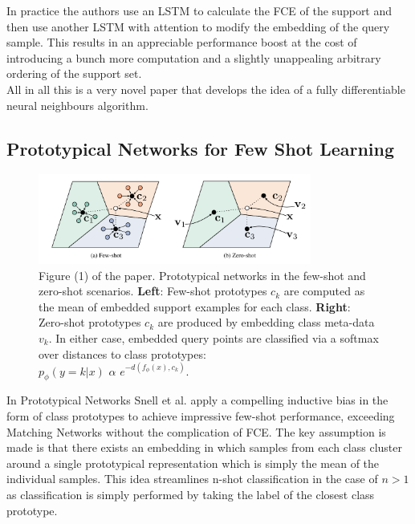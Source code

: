 \documentclass[runningheads,a4paper]{llncs}
\begin{document}
In practice the authors use an LSTM to calculate the FCE of the support and then use another LSTM with attention to modify the embedding of the query sample. This results in an appreciable performance boost at the cost of introducing a bunch more computation and a slightly unappealing arbitrary ordering of the support set. \\

All in all this is a very novel paper that develops the idea of a fully differentiable neural neighbours algorithm.

\subsection{Prototypical Networks for Few Shot Learning}

\begin{figure}[H]
    \centering
    \includegraphics[width=0.8\textwidth]{background/prototypical-networks.png}
    \caption{Figure (1) of the paper. Prototypical networks in the few-shot and zero-shot scenarios. \textbf{Left}: Few-shot prototypes $c_k$ are computed as the mean of embedded support examples for each class. \textbf{Right}: Zero-shot
prototypes $c_k$ are produced by embedding class meta-data $v_k$. In either case, embedded query points are classified via a softmax over distances to class prototypes: \\ $p_{\phi}(y = k|x)$ $\alpha$ $e^{−d(f_{\phi}(x), c_k)}$.}
    \label{figure:background:prototypical}
\end{figure}

In Prototypical Networks \cite{protonet} Snell et al. apply a compelling inductive bias in the form of class prototypes to achieve impressive few-shot performance, exceeding Matching Networks without the complication of FCE. The key assumption is made is that there exists an embedding in which samples from each class cluster around a single prototypical representation which is simply the mean of the individual samples. This idea streamlines n-shot classification in the case of $n > 1$ as classification is simply performed by taking the label of the closest class prototype.
\end{document}
